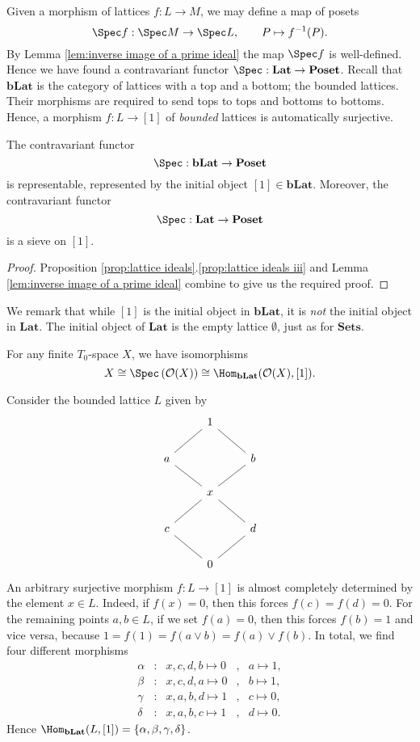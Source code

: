 Given a morphism of lattices $f : L \to M$, we may define a map of posets
\[ \Spec f : \Spec M \to \Spec L, \qquad P \mapsto f^{-1}(P). \]
By Lemma \ref{lem:inverse image of a prime ideal} the map $\Spec f$ is well-defined. Hence we have found a contravariant functor $\Spec : \mathbf{Lat} \to \mathbf{Poset}$. Recall that $\mathbf{bLat}$ is the category of lattices with a top and a bottom; the bounded lattices. Their morphisms are required to send tops to tops and bottoms to bottoms. Hence, a morphism $f : L \to [1]$ of \emph{bounded} lattices is automatically surjective.
\begin{theorem} \label{thm:spec hom representable}
The contravariant functor
\[ \Spec : \mathbf{bLat} \to \mathbf{Poset} \] is representable, represented by the initial object $[1] \in \mathbf{bLat}$. Moreover, the contravariant functor
\[ \Spec : \mathbf{Lat} \to \mathbf{Poset} \]
is a sieve on $[1]$.
\end{theorem}
\begin{proof}
Proposition \ref{prop:lattice ideals}.\ref{prop:lattice ideals iii} and Lemma \ref{lem:inverse image of a prime ideal} combine to give us the required proof.
\end{proof}
We remark that while $[1]$ is the initial object in $\mathbf{bLat}$, it is \emph{not} the initial object in $\mathbf{Lat}$. The initial object of $\mathbf{Lat}$ is the empty lattice $\emptyset$, just as for $\mathbf{Sets}$.

\begin{corollary}
For any finite $T_0$-space $X$, we have isomorphisms
\[ X \cong \Spec \left( \mathcal{O}(X) \right) \cong \Hom_{\mathbf{bLat}}(\mathcal{O}(X), [1]). \]
\end{corollary}

\begin{example}
\label{example:set of points of a lattice}
Consider the bounded lattice $L$ given by
\[ \begin{tikzcd}
& 1 \arrow[dl, no head] \arrow[dr, no head] & \\
a \arrow[dr, no head] & & b \arrow[dl, no head] \\
& x \arrow[dl, no head] \arrow[dr, no head] & \\
c \arrow[dr, no head] & & d \arrow[dl, no head] \\
& 0 & 
\end{tikzcd} \]
An arbitrary surjective morphism $f : L \to [1]$ is almost completely determined by the element $x \in L$. Indeed, if $f(x) = 0$, then this forces $f(c) = f(d) = 0$. For the remaining points $a,b \in L$, if we set $f(a) = 0$, then this forces $f(b) = 1$ and vice versa, because $1 = f(1) = f(a \vee b) = f(a) \vee f(b)$. In total, we find four different morphisms
\begin{align*}
\alpha &:& x,c,d,b \mapsto 0 &,& a \mapsto 1, \\
\beta  &:& x,c,d,a \mapsto 0 &,& b \mapsto 1, \\
\gamma &:& x,a,b,d \mapsto 1 &,& c \mapsto 0, \\
\delta &:& x,a,b,c \mapsto 1 &,& d \mapsto 0.
\end{align*}
Hence $\Hom_{\mathbf{bLat}}(L,[1]) = \left\{\alpha,\beta,\gamma,\delta \right\}$.
\end{example}

